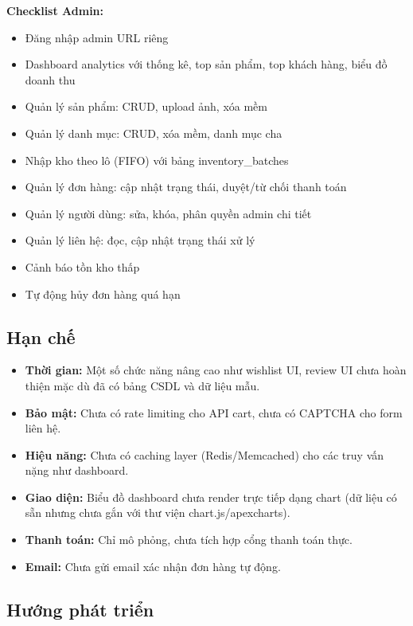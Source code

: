 \documentclass[a4paper]{article}
\begin{document}
\textbf{Checklist Admin:}
\begin{itemize}
    \item[$\checkmark$] Đăng nhập admin URL riêng
    \item[$\checkmark$] Dashboard analytics với thống kê, top sản phẩm, top khách hàng, biểu đồ doanh thu
    \item[$\checkmark$] Quản lý sản phẩm: CRUD, upload ảnh, xóa mềm
    \item[$\checkmark$] Quản lý danh mục: CRUD, xóa mềm, danh mục cha
    \item[$\checkmark$] Nhập kho theo lô (FIFO) với bảng inventory\_batches
    \item[$\checkmark$] Quản lý đơn hàng: cập nhật trạng thái, duyệt/từ chối thanh toán
    \item[$\checkmark$] Quản lý người dùng: sửa, khóa, phân quyền admin chi tiết
    \item[$\checkmark$] Quản lý liên hệ: đọc, cập nhật trạng thái xử lý
    \item[$\checkmark$] Cảnh báo tồn kho thấp
    \item[$\checkmark$] Tự động hủy đơn hàng quá hạn
\end{itemize}

\subsection*{Hạn chế}

\begin{itemize}
    \item \textbf{Thời gian:} Một số chức năng nâng cao như wishlist UI, review UI chưa hoàn thiện mặc dù đã có bảng CSDL và dữ liệu mẫu.
    \item \textbf{Bảo mật:} Chưa có rate limiting cho API cart, chưa có CAPTCHA cho form liên hệ.
    \item \textbf{Hiệu năng:} Chưa có caching layer (Redis/Memcached) cho các truy vấn nặng như dashboard.
    \item \textbf{Giao diện:} Biểu đồ dashboard chưa render trực tiếp dạng chart (dữ liệu có sẵn nhưng chưa gắn với thư viện chart.js/apexcharts).
    \item \textbf{Thanh toán:} Chỉ mô phỏng, chưa tích hợp cổng thanh toán thực.
    \item \textbf{Email:} Chưa gửi email xác nhận đơn hàng tự động.
\end{itemize}

\subsection*{Hướng phát triển}
\end{document}

